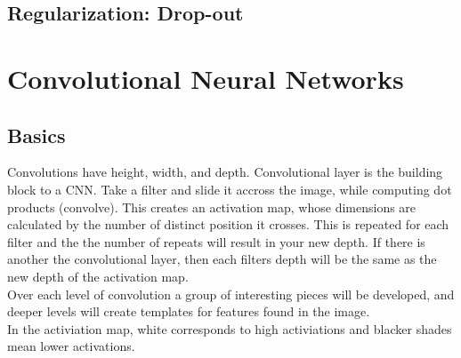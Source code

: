 \documentclass[11pt]{article}
\begin{document}
\begin{enumerate}
\subsection{Regularization: Drop-out}
\label{sec-2-10}
\section{Convolutional Neural Networks}
\label{sec-3}
\subsection{Basics}
\label{sec-3-1}
Convolutions have height, width, and depth. Convolutional layer is the building block to a CNN.
Take a filter and slide it accross the image, while computing dot products (convolve). This creates an
activation map, whose dimensions are calculated by the number of distinct position it crosses. This is repeated
for each filter and the the number of repeats will result in your new depth. If there is another the convolutional layer,
then each filters depth will be the same as the new depth of the activation map. \\
Over each level of convolution a group of interesting pieces will be developed, and deeper levels will create templates for features
found in the image. \\
In the activiation map, white corresponds to high activiations and blacker shades mean lower activations.

\end{enumerate}
\end{document}
